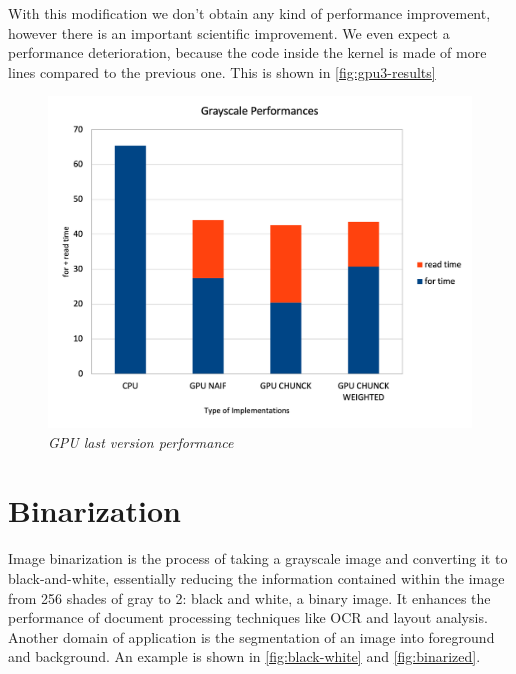 \documentclass[paper=a4, fontsize=10pt]{scrartcl}	%
\begin{document}
	With this modification we don't obtain any kind of performance improvement, however there is an important scientific improvement. We even expect a performance deterioration, because the code inside the kernel is made of more lines compared to the previous one. This is shown in \autoref{fig:gpu3-results}
	
	\begin{figure}[H]
		\centering
		\includegraphics[width=0.65\linewidth]{images/bw/Picture 4.png}
		\caption{\textit{GPU last version performance}}
		\label{fig:gpu3-results}
	\end{figure}
	
	\section{Binarization}

	Image binarization is the process of taking a grayscale image and converting it to black-and-white, essentially reducing the information contained within the image from 256 shades of gray to 2: black and white, a binary image. It enhances the 
	performance of document processing techniques like OCR and layout analysis. Another domain of application is the segmentation of an image into foreground and background. An example is shown in \autoref{fig:black-white} and \autoref{fig:binarized}.
\end{document}
